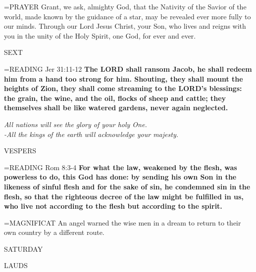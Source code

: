 \hangindent=\parindent \small{PRAYER 	Grant, we ask, almighty God, that the Nativity of the Savior of the world, made known by the guidance of a star, may be revealed ever more fully to our minds. Through our Lord Jesus Christ, your Son, who lives and reigns with you in the unity of the Holy Spirit, one God, for ever and ever.}

\begin{flushleft}\normalsize SEXT\\\end{flushleft}

\hangindent=\parindent \small{\uppercase{READING}}   Jer 31:11-12 \textbf{  The LORD shall ransom Jacob, he shall redeem him from a hand too strong for him. Shouting, they shall mount the heights of Zion, they shall come streaming to the LORD’s blessings: the grain, the wine, and the oil, flocks of sheep and cattle; they themselves shall be like watered gardens, never again neglected.\\}

\begin{center}
\textit{All nations will see the glory of your holy One.\\
-All the kings of the earth will acknowledge your majesty.}
\end{center}

\begin{flushleft}\normalsize VESPERS\\\end{flushleft}

\hangindent=\parindent \small{\uppercase{READING}}   Rom 8:3-4 \textbf{  For what the law, weakened by the flesh, was powerless to do, this God has done: by sending his own Son in the likeness of sinful flesh and for the sake of sin, he condemned sin in the flesh, so that the righteous decree of the law might be fulfilled in us, who live not according to the flesh but according to the spirit.\\}

\hangindent=\parindent \small{MAGNIFICAT 	An angel warned the wise men in a dream to return to their own country by a different route.\\}

\begin{center}
\normalsize SATURDAY
\end{center}

\begin{flushleft}\normalsize LAUDS\\\end{flushleft}

